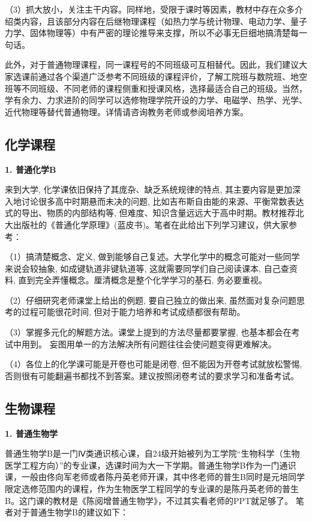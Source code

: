 \documentclass[11pt,oneside]{book}
\begin{document}
（3）抓大放小，关注主干内容。同样地，受限于课时等因素，教材中存在众多介绍类内容，且该部分内容在后继物理课程（如热力学与统计物理、电动力学、量子力学、固体物理等）中有严密的理论推导来支撑，所以不必事无巨细地搞清楚每一句话。

\vspace{20pt}

此外，对于普通物理课程，同一课程号的不同班级可互相替代。因此，我们建议大家选课前通过各个渠道广泛参考不同班级的课程评价，了解工院班与数院班、地空班等不同班级、不同老师的课程侧重和授课风格，选择最适合自己的班级。当然，学有余力、力求进阶的同学可以选修物理学院开设的力学、电磁学、热学、光学、近代物理等替代普通物理。详情请咨询教务老师或参阅培养方案。

\subsection{化学课程}

\textbf{1. 普通化学B}

来到大学, 化学课依旧保持了其庞杂、缺乏系统规律的特点, 其主要内容是更加深入地讨论很多高中时期悬而未决的问题, 比如吉布斯自由能的来源、平衡常数表达式的导出、物质的内部结构等, 但难度、知识含量远远大于高中时期。教材推荐北大出版社的《普通化学原理》(蓝皮书)。笔者在此给出下列学习建议，供大家参考：

（1）搞清楚概念、定义, 做到能够自己复述。大学化学中的概念可能对一些同学来说会较抽象, 如成键轨道非键轨道等, 这就需要同学们自己阅读课本, 自己查资料, 直到完全弄懂概念。厘清概念是整个化学学习的基石, 务必要重视。

（2）仔细研究老师课堂上给出的例题, 要自己独立的做出来, 虽然面对复杂问题思考的过程可能很花时间, 但对于能力培养和考试成绩都很有帮助。

（3）掌握多元化的解题方法。课堂上提到的方法尽量都要掌握, 也基本都会在考试中用到。 妄图用单一的方法解决所有问题往往会使问题变得更难解决。

（4）各位上的化学课可能是开卷也可能是闭卷, 但不能因为开卷考试就放松警惕, 否则很有可能翻遍书都找不到答案。建议按照闭卷考试的要求学习和准备考试。


\subsection{生物课程}

\textbf{1. 普通生物学}

普通生物学B是一门Ⅳ类通识核心课，自24级开始被列为工学院“生物科学（生物医学工程方向）”的专业课，选课时间为大一下学期。普通生物学B作为一门通识课，一般由佟向军老师或者陈丹英老师开课，其中佟老师的普生B同时是元培同学限定选修范围内的课程，作为生物医学工程同学的专业课的是陈丹英老师的普生B。这门课的教材是《陈阅增普通生物学》，不过其实看老师的PPT就足够了。
笔者对于普通生物学B的建议如下：
\end{document}
